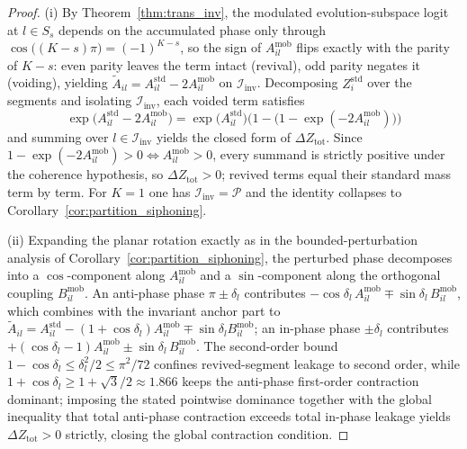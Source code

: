 \documentclass[11pt,a4paper]{article}
\theoremstyle{definition}
\begin{document}
\begin{proof}
(i) By Theorem~\ref{thm:trans_inv}, the modulated evolution-subspace logit at $l \in S_s$ depends on the accumulated phase only through $\cos\big((K-s)\pi\big) = (-1)^{K-s}$, so the sign of $A_{il}^{\text{mob}}$ flips exactly with the parity of $K - s$: even parity leaves the term intact (revival), odd parity negates it (voiding), yielding $\tilde{A}_{il} = A_{il}^{\text{std}} - 2A_{il}^{\text{mob}}$ on $\mathcal{I}_{\text{inv}}$. Decomposing $Z_i^{\mathrm{std}}$ over the segments and isolating $\mathcal{I}_{\text{inv}}$, each voided term satisfies
\begin{equation}
\exp\big(A_{il}^{\text{std}} - 2A_{il}^{\text{mob}}\big) = \exp\big(A_{il}^{\text{std}}\big)\Big(1 - \big(1 - \exp(-2A_{il}^{\text{mob}})\big)\Big)
\end{equation}
and summing over $l \in \mathcal{I}_{\text{inv}}$ yields the closed form of $\Delta Z_{\text{tot}}$. Since $1 - \exp(-2A_{il}^{\text{mob}}) > 0 \iff A_{il}^{\text{mob}} > 0$, every summand is strictly positive under the coherence hypothesis, so $\Delta Z_{\text{tot}} > 0$; revived terms equal their standard mass term by term. For $K = 1$ one has $\mathcal{I}_{\text{inv}} = \mathcal{P}$ and the identity collapses to Corollary~\ref{cor:partition_siphoning}.

(ii) Expanding the planar rotation exactly as in the bounded-perturbation analysis of Corollary~\ref{cor:partition_siphoning}, the perturbed phase decomposes into a $\cos$-component along $A_{il}^{\text{mob}}$ and a $\sin$-component along the orthogonal coupling $B_{il}^{\text{mob}}$. An anti-phase phase $\pi \pm \delta_l$ contributes $-\cos\delta_l\, A_{il}^{\text{mob}} \mp \sin\delta_l\, B_{il}^{\text{mob}}$, which combines with the invariant anchor part to $\tilde{A}_{il} = A_{il}^{\text{std}} - (1 + \cos\delta_l)A_{il}^{\text{mob}} \mp \sin\delta_l B_{il}^{\text{mob}}$; an in-phase phase $\pm \delta_l$ contributes $+(\cos\delta_l - 1)A_{il}^{\text{mob}} \pm \sin\delta_l\, B_{il}^{\text{mob}}$. The second-order bound $1 - \cos\delta_l \le \delta_l^2/2 \le \pi^2/72$ confines revived-segment leakage to second order, while $1 + \cos\delta_l \ge 1 + \sqrt{3}/2 \approx 1.866$ keeps the anti-phase first-order contraction dominant; imposing the stated pointwise dominance together with the global inequality that total anti-phase contraction exceeds total in-phase leakage yields $\Delta Z_{\text{tot}} > 0$ strictly, closing the global contraction condition.
\end{proof}
\end{document}
